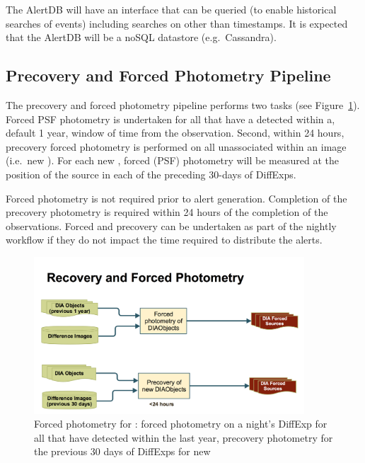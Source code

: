 The AlertDB will have an interface that can be queried (to enable historical searches of events) including searches on other than timestamps. It is expected that the AlertDB will be a noSQL datastore (e.g.\ Cassandra).






\clearpage

\subsection{Precovery and Forced Photometry Pipeline}

The precovery and forced photometry  pipeline performs two tasks (see Figure~\ref{fig:apForcedPrecovery}). Forced PSF photometry is undertaken for all \DIAObjects that have a detected \DIASource within a, default 1 year, window of time from the observation.  Second, within 24 hours, precovery forced photometry is performed on all unassociated \DIASources within an image (i.e.\ new \DIAObjects). For each new \DIAObject, forced (PSF) photometry will be measured at the position of the source in each of the preceding  30-days of DiffExps.

Forced photometry is not required prior to alert generation. Completion of the precovery photometry is required within 24 hours of the completion of the observations. Forced and precovery can be undertaken as part of the nightly workflow if they do not impact the time required to distribute the alerts.

\begin{figure}[th]
\begin{center}
\includegraphics[width=0.9\textwidth]{figures/Forced_Precovery.png}
\caption{\label{fig:apForcedPrecovery} Forced photometry for \DIAObjects: forced photometry on a night's DiffExp for all \DIAObjects that have detected \DIASources within the last year, precovery photometry for the previous 30 days of DiffExps for new \DIAObjects}
\end{center}
\end{figure} 

